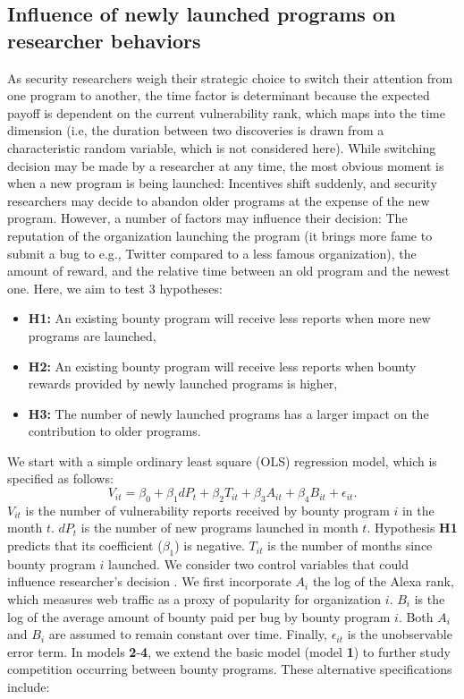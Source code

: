 \subsection{Influence of newly launched programs on researcher behaviors}
\label{ols}
As security researchers weigh their strategic choice to switch their attention from one program to another, the time factor is determinant because the expected payoff is dependent on the current vulnerability rank, which maps into the time dimension (i.e, the duration between two discoveries is drawn from a characteristic random variable, which is not considered here). While switching decision may be made by a researcher at any time, the most obvious moment is when a new program is being launched: Incentives shift suddenly, and security researchers may decide to abandon older programs at the expense of the new program. However, a number of factors may  influence their decision: The reputation of the organization launching the program (it brings more fame to submit a bug to e.g., Twitter compared to a less famous organization), the amount of reward, and the relative time between an old program and the newest one. Here, we aim to test  3 hypotheses:
\begin{itemize}
  \item {\bf H1:} An existing bounty program will receive less reports when more new programs are launched,
  \item {\bf H2:} An existing bounty program will receive less reports when bounty rewards provided by newly launched programs is higher,
  \item {\bf H3:} The number of newly launched programs has a larger impact on the contribution to older programs.
\end{itemize}


We start with a simple ordinary least square (OLS) regression model, which is specified as follows:
\begin{equation}
\label{reg_base}
V_{it} = \beta_0 + \beta_1 dP_t + \beta_2 T_{it} + \beta_3 A_{it} + \beta_4 B_{it} + \epsilon_{it}.
\end{equation}
$V_{it}$ is the number of vulnerability reports received by bounty program $i$ in the month $t$. $dP_t$ is the number of new programs launched in month $t$. Hypothesis {\bf H1} predicts that its coefficient ($\beta_1$) is negative. $T_{it}$ is the number of months since bounty program $i$ launched. We consider two control variables that could influence researcher's decision \cite{zhao2015empirical}. We first incorporate $A_i$ the log of the Alexa rank, which measures web traffic as a proxy of popularity for organization $i$. $B_i$ is the log of the average amount of bounty paid per bug by bounty program $i$. Both $A_i$ and $B_i$ are assumed to remain constant over time. Finally, $\epsilon_{it}$ is the unobservable error term. In models {\bf 2}-{\bf 4}, we extend the basic model (model {\bf 1}) to further study competition occurring between bounty programs. These alternative specifications include:

